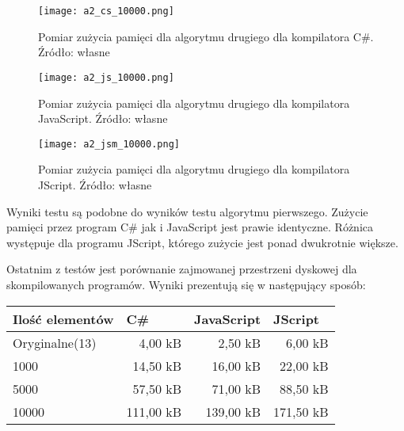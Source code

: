 \begin{figure}[!h]
  \centering
  \begin{minipage}{.48\textwidth}
    \centering
    \texttt{[image: a2\_cs\_10000.png]}
    \caption{Pomiar zużycia pamięci dla algorytmu drugiego dla kompilatora C\#. Źródło: własne}
    \label{fig:a}
  \end{minipage}
  \hfill
  \begin{minipage}{.48\textwidth}
    \centering
    \texttt{[image: a2\_js\_10000.png]}
    \caption{Pomiar zużycia pamięci dla algorytmu drugiego dla kompilatora JavaScript. Źródło: własne}
   \label{fig:a}
  \end{minipage}
\end{figure}

\begin{figure}[!h]
  \centering
  \texttt{[image: a2\_jsm\_10000.png]}
  \caption{Pomiar zużycia pamięci dla algorytmu drugiego dla kompilatora JScript. Źródło: własne}
  \label{fig:a}
\end{figure}

\par Wyniki testu są podobne do wyników testu algorytmu pierwszego. Zużycie pamięci przez program C\# jak i JavaScript jest prawie identyczne. Różnica występuje dla programu JScript, którego zużycie jest ponad dwukrotnie większe.

\newpage
\par Ostatnim z testów jest porównanie zajmowanej przestrzeni dyskowej dla skompilowanych programów. Wyniki prezentują się w następujący sposób:
\begin{table}[!h]
  \centering
  \begin{tabular}{|l|r|r|r|}
  \hline
  Ilość elementów & \multicolumn{1}{l|}{C\#} & \multicolumn{1}{l|}{JavaScript} & \multicolumn{1}{l|}{JScript} \\ \hline
  Oryginalne(13)  & 4,00 kB    & 2,50 kB       & 6,00 kB    \\ \hline
  1000            & 14,50 kB   & 16,00 kB      & 22,00 kB   \\ \hline
  5000            & 57,50 kB   & 71,00 kB      & 88,50 kB   \\ \hline
  10000           & 111,00 kB  & 139,00 kB     & 171,50 kB  \\ \hline
  \end{tabular}
\end{table}

